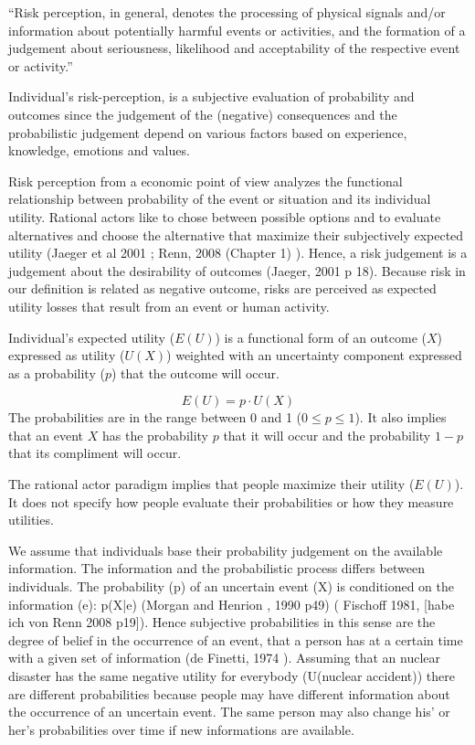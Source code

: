 ``Risk perception, in general, denotes the processing of physical signals and/or information about potentially harmful events or activities, and the formation of a judgement about seriousness, likelihood and acceptability of the respective event or activity.''   \citep[98]{Renn:2008wq}     

Individual's risk-perception, is a subjective evaluation of probability and outcomes since the judgement of the (negative) consequences and the probabilistic judgement depend on various factors based on experience, knowledge, emotions and values.        
 
Risk perception from a economic point of view analyzes the functional relationship between probability of the event or situation and its individual utility. 
Rational actors like to chose between possible options and to evaluate alternatives and choose the alternative that maximize their subjectively expected utility (Jaeger et al 2001 \citep{Jaeger:2001wv}; Renn, 2008 (Chapter 1) \citep{Renn:2008wq}).
Hence, a risk judgement is a judgement about the desirability of outcomes (Jaeger, 2001 p 18).  
Because risk in our definition is related as negative outcome, risks are perceived as expected utility losses that result from an event or human activity.
  
Individual's expected utility ($E(U)$) is a functional form of an outcome ($X$) expressed as utility ($U(X)$) weighted with an uncertainty component expressed as a probability ($p$) that the outcome will occur.  

\begin{equation}
   E(U) =  p \cdot U(X)  \nonumber
\end{equation}
The probabilities are in the range between 0 and 1 ($0 \leq p \leq 1$). It also implies that  an event $X$ has the probability $p$ that it will occur and the probability $1-p$ that its compliment will occur.  

The rational actor paradigm  implies that people maximize their utility ($E(U)$). It does not specify how people evaluate their probabilities or how they measure utilities. 

We assume that individuals base their probability judgement on the available information. The information and the probabilistic process differs between individuals. The probability (p) of an uncertain event (X) is conditioned on the information (e): p(X|e) (Morgan and Henrion , 1990 p49) ( Fischoff 1981, \citep{Fischhoff:1981tx} [habe ich von Renn 2008 p19]).  Hence subjective probabilities in this sense are the degree of belief in the occurrence of an event, that a person has at a certain time with a given set of information  (de Finetti, 1974 \citep{deFinetti:1974ua}).  
Assuming that an nuclear disaster has the same negative utility for everybody (U(nuclear accident)) there are different probabilities because people may have different information about the occurrence of an uncertain event. The same person may also change his' or her's probabilities over time if new informations are available.

